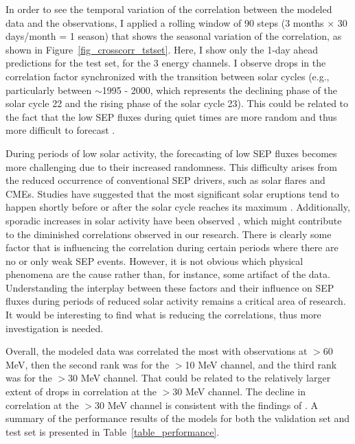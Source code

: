 In order to see the temporal variation of the correlation between the modeled data and the observations, I applied a rolling window of 90 steps (3 months × 30 days/month = 1 season) that shows the seasonal variation of the correlation, as shown in Figure~\ref{fig_crosscorr_tstset}.  
Here, I show only the 1-day ahead predictions for the test set, for the 3 energy channels. 
I observe drops in the correlation factor synchronized with the transition between solar cycles (e.g., particularly between $\sim$1995 - 2000, which represents the declining phase of the solar cycle 22 and the rising phase of the solar cycle 23). This could be related to the fact that the low SEP fluxes during quiet times are more random and thus more difficult to forecast \citep{feynman_1990, gabriel_1990, rodriguez_2010, xapsos_2012}.

During periods of low solar activity, the forecasting of low SEP fluxes becomes more challenging due to their increased randomness. This difficulty arises from the reduced occurrence of conventional SEP drivers, such as solar flares and CMEs. Studies have suggested that the most significant solar eruptions tend to happen shortly before or after the solar cycle reaches its maximum \citep{vsvestka_1995}. Additionally, sporadic increases in solar activity have been observed \citep{kane_2011}, which might contribute to the diminished correlations observed in our research.
There is clearly some factor that is influencing the correlation during certain periods where there are no or only weak SEP events. However, it is not obvious which physical phenomena are the cause rather than, for instance, some artifact of the data. Understanding the interplay between these factors and their influence on SEP fluxes during periods of reduced solar activity remains a critical area of research. It would be interesting to find what is reducing the correlations, thus more investigation is needed.

Overall, the modeled data was correlated the most with observations at $>$60 MeV, then the second rank was for the $>$10 MeV channel, and the third rank was for the $>$30 MeV channel. That could be related to the relatively larger extent of drops in correlation at the $>$30 MeV channel.
The decline in correlation at the $>$30 MeV channel is consistent with the findings of \citet{le_2017}.
A summary of the performance results of the models for both the validation set and test set is presented in Table~\ref{table_performance}.


